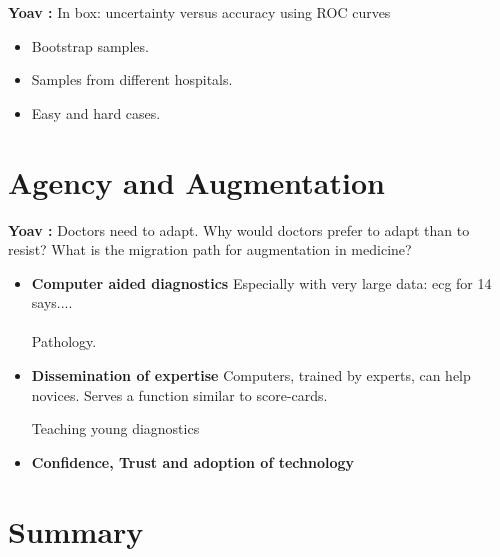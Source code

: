 \documentclass[9pt,twocolumn,twoside]{pnas-new}
\newcommand{\comment}[3]{{\color{#1} {\bf #2 :} #3}}
\newcommand{\yoav}[1]{\comment{red}{Yoav}{#1}}
\begin{document}
\yoav{In box: uncertainty versus accuracy using ROC curves}

\begin{itemize}
  \item Bootstrap samples.
  \item Samples from different hospitals.
  \item Easy and hard cases.
  \end{itemize}

\section*{Agency and Augmentation}
\yoav{Doctors need to adapt. Why would doctors prefer to adapt than to
  resist? What is the migration path for augmentation in medicine?}
\begin{itemize}
\item{\bf Computer aided diagnostics}
  Especially with very large data: ecg for 14 says.... \\
  ~\\

Pathology.

\item {\bf Dissemination of expertise}
Computers, trained by experts, can help novices.  Serves a function
similar to score-cards.

Teaching young diagnostics
\item { \bf Confidence, Trust and adoption of technology}
\end{itemize}

\section*{Summary}

% 

\end{document}
